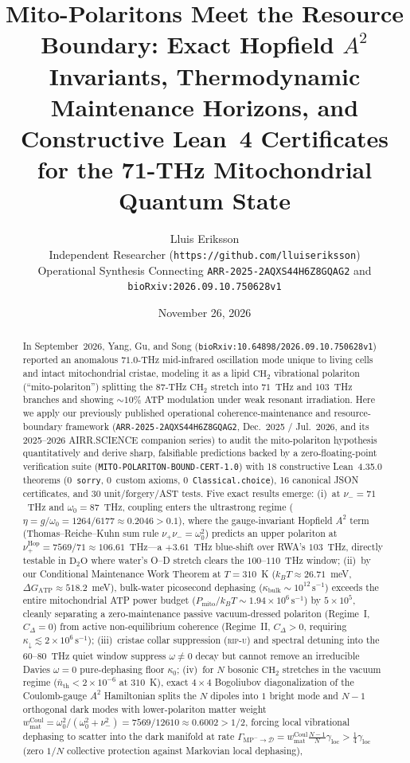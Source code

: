 \documentclass[10pt,twocolumn]{article}
\title{\vspace{-1.2em}\textbf{Mito-Polaritons Meet the Resource Boundary: Exact Hopfield $A^2$ Invariants, Thermodynamic Maintenance Horizons, and Constructive Lean~4 Certificates for the 71-THz Mitochondrial Quantum State}\vspace{-0.4em}}
\author{Lluis Eriksson\\
\small Independent Researcher (\nolinkurl{https://github.com/lluiseriksson})\\
\small Operational Synthesis Connecting \texttt{ARR-2025-2AQXS44H6Z8GQAG2} and \texttt{bioRxiv:2026.09.10.750628v1}\vspace{-0.6em}}
\date{November 26, 2026}
\begin{document}
\maketitle

\begin{abstract}
\noindent In September~2026, Yang, Gu, and Song (\texttt{bioRxiv:10.64898/2026.09.10.750628v1}) reported an anomalous $71.0$-THz mid-infrared oscillation mode unique to living cells and intact mitochondrial cristae, modeling it as a lipid $\text{CH}_2$ vibrational polariton (``mito-polariton'') splitting the $87$-THz $\text{CH}_2$ stretch into $71$~THz and $103$~THz branches and showing $\sim 10\%$ ATP modulation under weak resonant irradiation. Here we apply our previously published operational coherence-maintenance and resource-boundary framework (\texttt{ARR-2025-2AQXS44H6Z8GQAG2}, Dec.~2025 / Jul.~2026, and its 2025--2026 AIRR.SCIENCE companion series) to audit the mito-polariton hypothesis quantitatively and derive sharp, falsifiable predictions backed by a zero-floating-point verification suite (\texttt{MITO-POLARITON-BOUND-CERT-1.0}) with 18 constructive Lean~4.35.0 theorems (0~\texttt{sorry}, 0~custom axioms, 0~\texttt{Classical.choice}), 16 canonical JSON certificates, and 30 unit/forgery/AST tests. Five exact results emerge: (i)~at $\nu_- = 71$~THz and $\omega_0 = 87$~THz, coupling enters the ultrastrong regime ($\eta = g/\omega_0 = 1264/6177 \approx 0.2046 > 0.1$), where the gauge-invariant Hopfield $A^2$ term (Thomas--Reiche--Kuhn sum rule $\nu_+\nu_-=\omega_0^2$) predicts an upper polariton at $\nu_+^{\mathrm{Hop}} = 7569/71 \approx 106.61$~THz---a $+3.61$~THz blue-shift over RWA's $103$~THz, directly testable in $\text{D}_2\text{O}$ where water's O--D stretch clears the $100$--$110$~THz window; (ii)~by our Conditional Maintenance Work Theorem at $T=310$~K ($k_B T \approx 26.71$~meV, $\Delta G_{\mathrm{ATP}}\approx 518.2$~meV), bulk-water picosecond dephasing ($\kappa_{\mathrm{bulk}}\sim 10^{12}\,\mathrm{s}^{-1}$) exceeds the entire mitochondrial ATP power budget ($P_{\mathrm{mito}}/k_B T \sim 1.94\times 10^6\,\mathrm{s}^{-1}$) by $5\times 10^5$, cleanly separating a zero-maintenance passive vacuum-dressed polariton (Regime~I, $C_\Delta=0$) from active non-equilibrium coherence (Regime~II, $C_\Delta>0$, requiring $\kappa_\downarrow \lesssim 2\times 10^6\,\mathrm{s}^{-1}$); (iii)~cristae collar suppression (\textsc{rip-u}) and spectral detuning into the $60$--$80$~THz quiet window suppress $\omega\neq 0$ decay but cannot remove an irreducible Davies $\omega=0$ pure-dephasing floor $\kappa_0$; (iv)~for $N$ bosonic $\text{CH}_2$ stretches in the vacuum regime ($\bar{n}_{\mathrm{th}} < 2\times 10^{-6}$ at $310$~K), exact $4\times 4$ Bogoliubov diagonalization of the Coulomb-gauge $A^2$ Hamiltonian splits the $N$ dipoles into $1$ bright mode and $N-1$ orthogonal dark modes with lower-polariton matter weight $w_{\mathrm{mat}}^{\mathrm{Coul}} = \omega_0^2/(\omega_0^2+\nu_-^2) = 7569/12610 \approx 0.6002 > 1/2$, forcing local vibrational dephasing to scatter into the dark manifold at rate $\Gamma_{\mathrm{MP}^-\to\mathcal{D}} = w_{\mathrm{mat}}^{\mathrm{Coul}}\frac{N-1}{N}\gamma_{\mathrm{loc}} > \frac{1}{4}\gamma_{\mathrm{loc}}$ (zero $1/N$ collective protection against Markovian local dephasing), 
\end{abstract}
\end{document}
